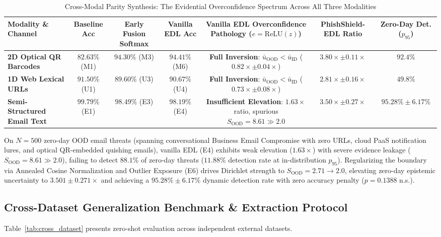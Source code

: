 \documentclass[conference]{IEEEtran}
\begin{document}
\begin{table}[t]
\caption{Cross-Modal Parity Synthesis: The Evidential Overconfidence Spectrum Across All Three Modalities}
\label{tab:trimodal_parity}
\centering
\begin{tabular}{lcccccc}
\toprule
\textbf{Modality \& Channel} & \textbf{Baseline Acc} & \textbf{Early Fusion Softmax} & \textbf{Vanilla EDL Acc} & \textbf{Vanilla EDL Overconfidence Pathology ($e = \text{ReLU}(z)$)} & \textbf{PhishShield-EDL Ratio} & \textbf{Zero-Day Det. ($p_{95}$)} \\
\midrule
\textbf{2D Optical QR Barcodes} & $82.63\%$ (M1) & $94.30\%$ (M3) & $94.41\%$ (M6) & \textbf{Full Inversion}: $\bar{u}_{\text{OOD}} < \bar{u}_{\text{ID}}$ ($\mathbf{0.82\times \pm 0.04\times}$) & $\mathbf{3.80\times \pm 0.11\times}$ & $92.4\%$ \\
\textbf{1D Web Lexical URLs} & $91.50\%$ (U1) & $89.60\%$ (U3) & $90.67\%$ (U4) & \textbf{Full Inversion}: $\bar{u}_{\text{OOD}} < \bar{u}_{\text{ID}}$ ($\mathbf{0.73\times \pm 0.08\times}$) & $\mathbf{2.81\times \pm 0.16\times}$ & $49.8\%$ \\
\textbf{Semi-Structured Email Text} & $99.79\%$ (E1) & $98.49\%$ (E3) & $98.19\%$ (E4) & \textbf{Insufficient Elevation}: $1.63\times$ ratio, spurious $S_{\text{OOD}} = 8.61 \gg 2.0$ & $\mathbf{3.50\times \pm 0.27\times}$ & $\mathbf{95.28\% \pm 6.17\%}$ \\
\bottomrule
\end{tabular}
\end{table}

On $N=500$ zero-day OOD email threats (spanning conversational Business Email Compromise with zero URLs, cloud PaaS notification lures, and optical QR-embedded quishing emails), vanilla EDL (E4) exhibits weak elevation ($1.63\times$) with severe evidence leakage ($S_{\text{OOD}} = 8.61 \gg 2.0$), failing to detect $88.1\%$ of zero-day threats ($11.88\%$ detection rate at in-distribution $p_{95}$). Regularizing the boundary via Annealed Cosine Normalization and Outlier Exposure (E6) drives Dirichlet strength to $S_{\text{OOD}} = 2.71 \to 2.0$, elevating zero-day epistemic uncertainty to $3.501 \pm 0.271\times$ and achieving a $95.28\% \pm 6.17\%$ dynamic detection rate with zero accuracy penalty ($p = 0.1388$ n.s.).

\subsection{Cross-Dataset Generalization Benchmark \& Extraction Protocol}
Table~\ref{tab:cross_dataset} presents zero-shot evaluation across independent external datasets.
\end{document}
